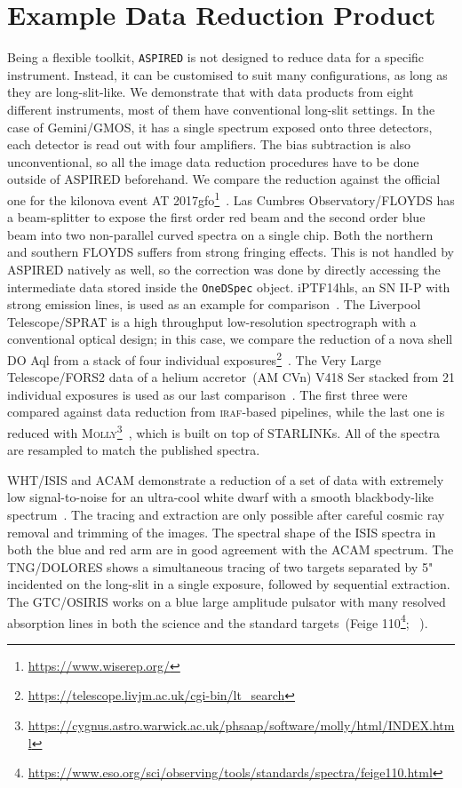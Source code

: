 \documentclass[linenumbers, twocolumn]{aastex631}
\begin{document}
\section{Example Data Reduction Product}
\label{sec:examples}
Being a flexible toolkit, \texttt{ASPIRED} is not designed to reduce data for a
specific instrument. Instead, it can be customised to suit many configurations,
as long as they are long-slit-like. We demonstrate that with data products
from eight different instruments, most of them have conventional long-slit
settings. In the case of Gemini/GMOS, it has a single spectrum exposed onto
three detectors, each detector is read out with four amplifiers. The bias 
subtraction is also unconventional, so all the image data reduction procedures
have to be done outside of ASPIRED beforehand. We compare the reduction against
the official one for the kilonova event AT 2017gfo\footnote{\url{https://www.wiserep.org/}}~\citep{2017ApJ...848L..32M}. Las Cumbres
Observatory/FLOYDS has a beam-splitter to expose
the first order red beam and the second order blue beam into two non-parallel
curved spectra on a single chip. Both the northern and southern FLOYDS suffers
from strong fringing effects. This is not handled by ASPIRED natively as well,
so the correction was done by directly accessing the intermediate data stored
inside the \texttt{OneDSpec} object. iPTF14hls, an SN II-P with strong emission
lines, is used as an example for comparison~\citep{2017Natur.551..210A}. The
Liverpool Telescope/SPRAT is a high throughput low-resolution spectrograph with
a conventional optical design; in this case, we compare the reduction of a nova 
shell DO Aql from a stack of four individual 
exposures\footnote{\url{https://telescope.livjm.ac.uk/cgi-bin/lt_search}}~\citep{2020MNRAS.499.2959H}. The Very Large Telescope/FORS2 data
of a helium accretor~(AM CVn) V418 Ser stacked from 21 individual exposures is
used as our last comparison~\citep{2020MNRAS.496.1243G}. The first three were 
compared against data reduction from \textsc{iraf}-based pipelines, while the
last one is reduced with \textsc{Molly}\footnote{
\url{https://cygnus.astro.warwick.ac.uk/phsaap/software/molly/html/INDEX.html}}~\citep{2019ascl.soft07012M},
which is built on top of STARLINKs. All of the spectra are resampled to match
the published spectra.

WHT/ISIS and ACAM demonstrate a reduction of a set of data with extremely low
signal-to-noise for an ultra-cool white dwarf with a smooth blackbody-like
spectrum~\citep{2020MNRAS.493.6001L}. The tracing and extraction are only
possible after careful cosmic ray removal and trimming of the images. The
spectral shape of the ISIS spectra in both the blue and red arm are in good
agreement with the ACAM spectrum. The TNG/DOLORES shows a simultaneous tracing
of two targets separated by 5" incidented on the long-slit in a single exposure,
followed by sequential extraction. The GTC/OSIRIS works on a blue large
amplitude pulsator with many resolved absorption lines in both the science and
the standard targets~(Feige 110\footnote{
\url{https://www.eso.org/sci/observing/tools/standards/spectra/feige110.html}}; ~\citealp{2022MNRAS.511.4971M}). 
\end{document}

